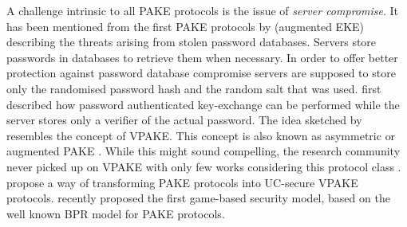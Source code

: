 A challenge intrinsic to all \ac{PAKE} protocols is the issue of \emph{server compromise}.
It has been mentioned from the first PAKE protocols by \citet{BellovinM93} (augmented EKE) describing the threats arising from stolen password databases.
Servers store passwords in databases to retrieve them when necessary.
In order to offer better protection against password database compromise servers are supposed to store only the randomised password hash and the random salt that was used.
\citet{BellovinM93} first described how password authenticated key-exchange can be performed while the server stores only a verifier of the actual password.
The idea sketched by \citet{BellovinM93} resembles the concept of \ac{VPAKE}.
This concept is also known as asymmetric \cite{Bellare2000} or augmented \ac{PAKE} \cite{BellovinM93}.
While this might sound compelling, the research community never picked up on \ac{VPAKE} with only few works considering this protocol class \cite{Wu1998,Gentry2006,Boyen2009a,BenhamoudaP13}.
\citet{Gentry2006} propose a way of transforming \ac{PAKE} protocols into \ac{UC}-secure \ac{VPAKE} protocols.
\citet{BenhamoudaP13} recently proposed the first game-based security model, based on the well known BPR model for \ac{PAKE} protocols.





